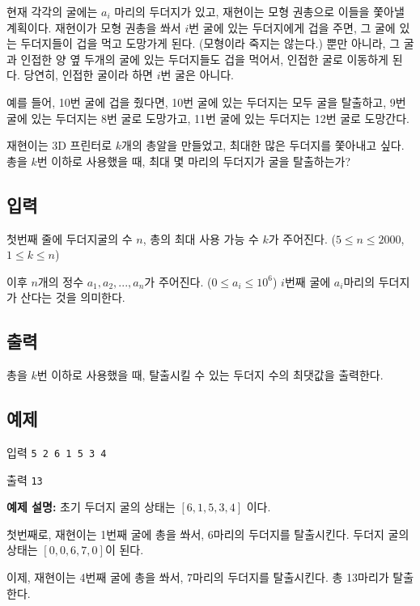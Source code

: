 \documentclass{article}
\begin{document}
현재 각각의 굴에는 $a_i$ 마리의 두더지가 있고, 재현이는 모형 권총으로 이들을 쫓아낼 계획이다. 재현이가 모형 권총을 쏴서 $i$번 굴에 있는 두더지에게 겁을 주면, 그 굴에 있는 두더지들이 겁을 먹고 도망가게 된다. (모형이라 죽지는 않는다.) 뿐만 아니라, 그 굴과 인접한 양 옆 두개의 굴에 있는 두더지들도 겁을 먹어서, 인접한 굴로 이동하게 된다. 당연히, 인접한 굴이라 하면 $i$번 굴은 아니다. \newline

예를 들어, 10번 굴에 겁을 줬다면, 10번 굴에 있는 두더지는 모두 굴을 탈출하고, 9번 굴에 있는 두더지는 8번 굴로 도망가고, 11번 굴에 있는 두더지는 12번 굴로 도망간다. \newline

재현이는 3D 프린터로 $k$개의 총알을 만들었고, 최대한 많은 두더지를 쫓아내고 싶다. 총을 $k$번 이하로 사용했을 때, 최대 몇 마리의 두더지가 굴을 탈출하는가?

\subsection{입력}
첫번째 줄에 두더지굴의 수 $n$, 총의 최대 사용 가능 수 $k$가 주어진다. ($5 \leq n \leq 2000$, $1 \leq k \leq n$) \newline

이후 $n$개의 정수 $a_1, a_2, ..., a_n$가 주어진다. ($0 \leq a_i \leq 10^6$) $i$번째 굴에 $a_i$마리의 두더지가 산다는 것을 의미한다.


\subsection{출력}
총을 $k$번 이하로 사용했을 때, 탈출시킬 수 있는 두더지 수의 최댓값을 출력한다.

\subsection{예제}
입력
\bgroup\obeylines
\texttt{5 2
	6 1 5 3 4	\newline}
\egroup

출력
\bgroup\obeylines
\texttt{13	\newline}
\egroup

\textbf{예제 설명:} 초기 두더지 굴의 상태는 $[6, 1, 5, 3, 4]$ 이다. \newline

첫번째로, 재현이는 1번째 굴에 총을 쏴서, 6마리의 두더지를 탈출시킨다. 두더지 굴의 상태는 $[0, 0, 6, 7, 0]$이 된다. \newline

이제, 재현이는 4번째 굴에 총을 쏴서, 7마리의 두더지를 탈출시킨다. 총 13마리가 탈출한다.
\end{document}
